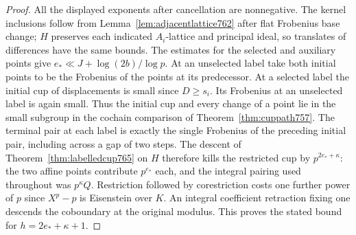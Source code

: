 \documentclass[a4paper,11pt]{article}
\theoremstyle{definition}
\theoremstyle{remark}
\numberwithin{equation}{section}
\begin{document}
\begin{proof}
All the displayed exponents after cancellation are
nonnegative. The kernel inclusions follow from
Lemma~\ref{lem:adjacentlattice762} after flat Frobenius
base change; \(H\) preserves each indicated \(A_i\)-lattice
and principal ideal, so translates of differences have the
same bounds. The estimates for the selected and auxiliary
points give \(e_*\ll J+\log(2b)/\log p\). At an unselected
label take both initial points to be the Frobenius of the
points at its predecessor. At a selected label the initial
cup of displacements is small since \(D\ge s_i\). Its
Frobenius at an unselected label is again small.
Thus the initial cup and every change of a point lie in
the small subgroup in the cochain comparison of
Theorem~\ref{thm:cuppath757}. The terminal pair at each
label is exactly the single Frobenius of the preceding
initial pair, including across a gap of two steps.
The descent of Theorem~\ref{thm:labelledcup765} on \(H\)
therefore kills the restricted cup by \(p^{2e_*+\kappa}\):
the two affine points contribute \(p^{e_*}\) each, and
the integral pairing used throughout was \(p^\kappa Q\).
Restriction followed by corestriction costs one further
power of \(p\) since \(X^p-p\) is Eisenstein over \(K\).
An integral coefficient retraction fixing one descends the
coboundary at the original modulus. This proves the stated
bound for \(h=2e_*+\kappa+1\).
\end{proof}
\end{document}
